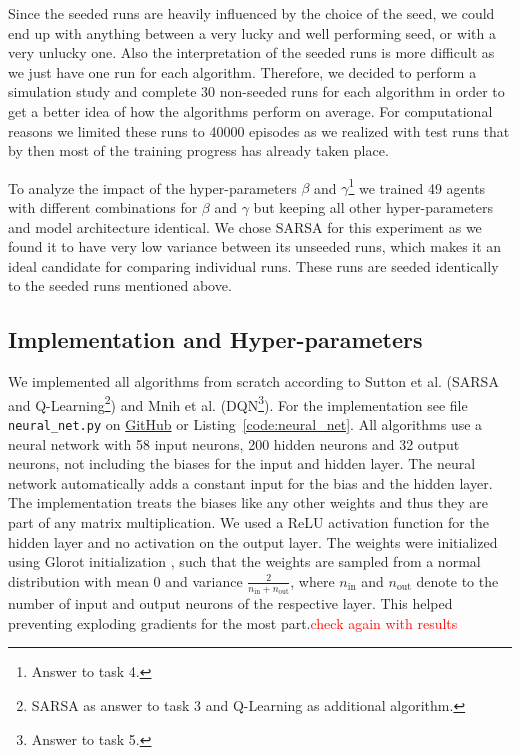 \documentclass[conference]{IEEEtran}
\begin{document}
Since the seeded runs are heavily influenced by the choice of the seed, we could end up with anything between a very lucky and well performing seed, or with a very unlucky one. Also the interpretation of the seeded runs is more difficult as we just have one run for each algorithm. Therefore, we decided to perform a simulation study and complete 30 non-seeded runs for each algorithm in order to get a better idea of how the algorithms perform on average. For computational reasons we limited these runs to 40000 episodes as we realized with test runs that by then most of the training progress has already taken place.

To analyze the impact of the hyper-parameters $\beta$ and $\gamma$\footnote{Answer to task 4.} we trained 49 agents with different combinations for $\beta$ and $\gamma$ but keeping all other hyper-parameters and model architecture identical. We chose SARSA for this experiment as we found it to have very low variance between its unseeded runs, which makes it an ideal candidate for comparing individual runs. These runs are seeded identically to the seeded runs mentioned above.




\subsection{Implementation and Hyper-parameters}\label{sec:implementation_hyper-parameters}



We implemented all algorithms from scratch according to Sutton et al. \cite{sutton2018} (SARSA and Q-Learning\footnote{SARSA as answer to task 3 and Q-Learning as additional algorithm.}) and Mnih et al. \cite{dqn2015} (DQN\footnote{Answer to task 5.}). For the implementation see file \verb"neural_net.py" on \href{https://github.com/TwoDigitsOneNumber/IntroRL_ChessAssignment}{GitHub} or Listing~\ref{code:neural_net}. All algorithms use a neural network with 58 input neurons, 200 hidden neurons and 32 output neurons, not including the biases for the input and hidden layer. The neural network automatically adds a constant input for the bias and the hidden layer. 
The implementation treats the biases like any other weights and thus they are part of any matrix multiplication. We used a ReLU activation function for the hidden layer and no activation on the output layer.
The weights were initialized using Glorot initialization \cite{glorot2010}, such that the weights are sampled from a normal distribution with mean 0 and variance $\frac{2}{n_{\text{in}} + n_{\text{out}}}$, where $n_\text{in}$ and $n_\text{out}$ denote to the number of input and output neurons of the respective layer. This helped preventing exploding gradients for the most part.\textcolor{red}{check again with results}
\end{document}
